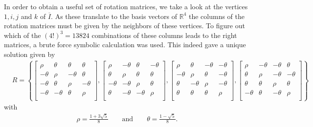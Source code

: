 In order to obtain a useful set of rotation matrices, we take a look at the vertices $1,i,j$ and $k$ of $\overline{I}$. As these translate to the basis vectors of $\mathbb{R}^4$ the columns of the rotation matrices must be given by the neighbors of these vertices. To figure out which of the $(4!)^3 = 13824$ combinations of these columns leads to the right matrices, a brute force symbolic calculation was used. This indeed gave a unique solution given by
\begin{align*}
  & R = \left\{
 \begin{bmatrix}
  \rho    & \theta  & \theta  & \theta  \\
  -\theta & \rho    & -\theta & \theta  \\
  -\theta & \theta  & \rho    & -\theta \\
  -\theta & -\theta & \theta  & \rho    \\
 \end{bmatrix},
 \begin{bmatrix}
  \rho    & -\theta & \theta  & -\theta \\
  \theta  & \rho    & \theta  & \theta  \\
  -\theta & -\theta & \rho    & \theta  \\
  \theta  & -\theta & -\theta & \rho    \\
 \end{bmatrix},
 \begin{bmatrix}
  \rho    & \theta  & -\theta & -\theta \\
  -\theta & \rho    & \theta  & -\theta \\
  \theta  & -\theta & \rho    & -\theta \\
  \theta  & \theta  & \theta  & \rho    \\
 \end{bmatrix},
 \begin{bmatrix}
  \rho    & -\theta & -\theta & \theta  \\
  \theta  & \rho    & -\theta & -\theta \\
  \theta  & \theta  & \rho    & \theta  \\
  -\theta & \theta  & -\theta & \rho    \\
 \end{bmatrix}
 \right\}
\end{align*}
with
\begin{align*}                                                                   \rho = \frac{1 + 3\sqrt{5}}{8} \qquad \textrm{and} \qquad \theta = \frac{1-\sqrt{5}}{8} \textrm{.}
\end{align*}
